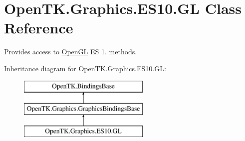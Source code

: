 \hypertarget{class_open_t_k_1_1_graphics_1_1_e_s10_1_1_g_l}{\section{Open\-T\-K.\-Graphics.\-E\-S10.\-G\-L Class Reference}
\label{class_open_t_k_1_1_graphics_1_1_e_s10_1_1_g_l}
}


Provides access to \hyperlink{namespace_open_t_k_1_1_graphics_1_1_open_g_l}{Open\-G\-L} E\-S 1. methods.  


Inheritance diagram for Open\-T\-K.\-Graphics.\-E\-S10.\-G\-L\-:\begin{figure}[H]
\begin{center}
\leavevmode
\includegraphics[height=3.000000cm]{class_open_t_k_1_1_graphics_1_1_e_s10_1_1_g_l}
\end{center}
\end{figure}
